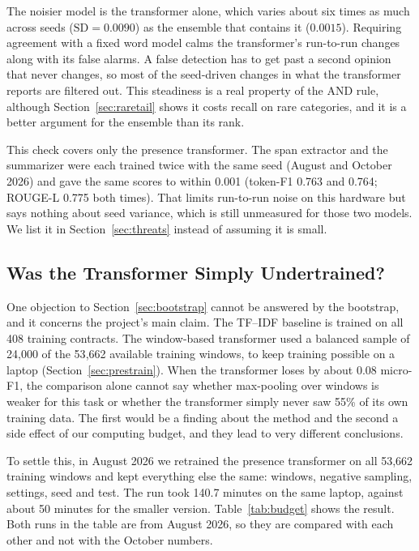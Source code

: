 The noisier model is the transformer alone, which varies about six times as much across seeds ($\mathrm{SD} = 0.0090$) as the ensemble that contains it ($0.0015$). Requiring agreement with a fixed word model calms the transformer's run-to-run changes along with its false alarms. A false detection has to get past a second opinion that never changes, so most of the seed-driven changes in what the transformer reports are filtered out. This steadiness is a real property of the AND rule, although Section~\ref{sec:raretail} shows it costs recall on rare categories, and it is a better argument for the ensemble than its rank.

This check covers only the presence transformer. The span extractor and the summarizer were each trained twice with the same seed (August and October 2026) and gave the same scores to within 0.001 (token-F1 0.763 and 0.764; ROUGE-L 0.775 both times). That limits run-to-run noise on this hardware but says nothing about seed variance, which is still unmeasured for those two models. We list it in Section~\ref{sec:threats} instead of assuming it is small.
\subsection{Was the Transformer Simply Undertrained?}
\label{sec:budget}
One objection to Section~\ref{sec:bootstrap} cannot be answered by the bootstrap, and it concerns the project's main claim. The TF--IDF baseline is trained on all 408 training contracts. The window-based transformer used a balanced sample of 24{,}000 of the 53{,}662 available training windows, to keep training possible on a laptop (Section~\ref{sec:prestrain}). When the transformer loses by about 0.08 micro-F1, the comparison alone cannot say whether max-pooling over windows is weaker for this task or whether the transformer simply never saw 55\% of its own training data. The first would be a finding about the method and the second a side effect of our computing budget, and they lead to very different conclusions.

To settle this, in August 2026 we retrained the presence transformer on all 53{,}662 training windows and kept everything else the same: windows, negative sampling, settings, seed and test. The run took 140.7 minutes on the same laptop, against about 50 minutes for the smaller version. Table~\ref{tab:budget} shows the result. Both runs in the table are from August 2026, so they are compared with each other and not with the October numbers.

